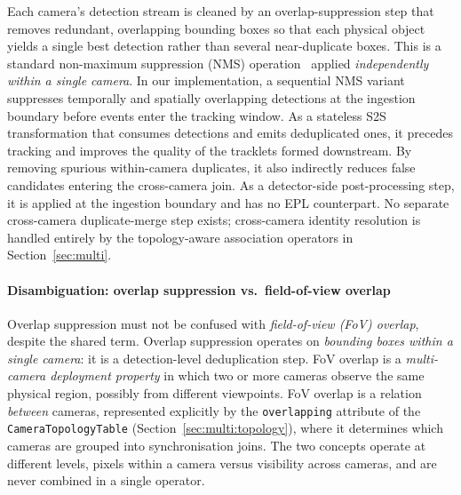 \documentclass[review]{elsarticle}
\begin{document}
Each camera's detection stream is cleaned by an overlap-suppression step that removes redundant, overlapping bounding boxes so that each physical object yields a single best detection rather than several near-duplicate boxes. This is a standard non-maximum suppression (NMS) operation~\cite{neubeck2006efficient} %
applied \emph{independently within a single camera}. In our implementation, a sequential NMS variant suppresses temporally and spatially overlapping detections at the ingestion boundary before events enter the tracking window. As a stateless S2S transformation that consumes detections and emits deduplicated ones, it precedes tracking and improves the quality of the tracklets formed downstream. By removing spurious within-camera duplicates, it also indirectly reduces false candidates entering the cross-camera join. As a detector-side post-processing step, it is applied at the ingestion boundary and has no EPL counterpart. No separate cross-camera duplicate-merge step exists; cross-camera identity resolution is handled entirely by the topology-aware association operators in Section~\ref{sec:multi}.

\paragraph{Disambiguation: overlap suppression vs.\ field-of-view overlap}

Overlap suppression must not be confused with \emph{field-of-view (FoV) overlap}, despite the shared term. Overlap suppression operates on \emph{bounding boxes within a single camera}: it is a detection-level deduplication step. FoV overlap is a \emph{multi-camera deployment property} in which two or more cameras observe the same physical region, possibly from different viewpoints. FoV overlap is a relation \emph{between} cameras, represented explicitly by the \texttt{overlapping} attribute of the \texttt{CameraTopologyTable} (Section~\ref{sec:multi:topology}), where it determines which cameras are grouped into synchronisation joins. The two concepts operate at different levels, pixels within a camera versus visibility across cameras, and are never combined in a single operator.

\end{document}
